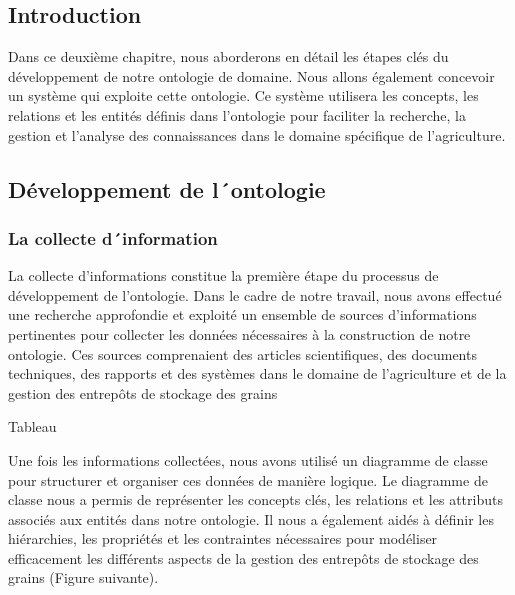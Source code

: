 \documentclass{article}
\begin{document}
	\subsection{Introduction}
	Dans ce deuxième chapitre, nous aborderons en détail les étapes clés du développement
	de notre ontologie de domaine. Nous allons également concevoir un système qui exploite cette
	ontologie. Ce système utilisera les concepts, les relations et les entités définis dans l'ontologie
	pour faciliter la recherche, la gestion et l'analyse des connaissances dans le domaine spécifique
	de l'agriculture.
	
	\subsection{Développement de l´ontologie}
	\subsubsection{La collecte d´information}
	
		La collecte d'informations constitue la première étape du processus de développement
	de l'ontologie. Dans le cadre de notre travail, nous avons effectué une recherche approfondie et
	exploité un ensemble de sources d'informations pertinentes pour collecter les données
	nécessaires à la construction de notre ontologie. Ces sources comprenaient des articles
	scientifiques, des documents techniques, des rapports et des systèmes dans le domaine de
	l'agriculture et de la gestion des entrepôts de stockage des grains
	
	Tableau
	
	Une fois les informations collectées, nous avons utilisé un diagramme de classe pour
	structurer et organiser ces données de manière logique. Le diagramme de classe nous a permis
	de représenter les concepts clés, les relations et les attributs associés aux entités dans notre
	ontologie. Il nous a également aidés à définir les hiérarchies, les propriétés et les contraintes
	nécessaires pour modéliser efficacement les différents aspects de la gestion des entrepôts de
	stockage des grains (Figure suivante).
	
	\newpage
	
\end{document}
